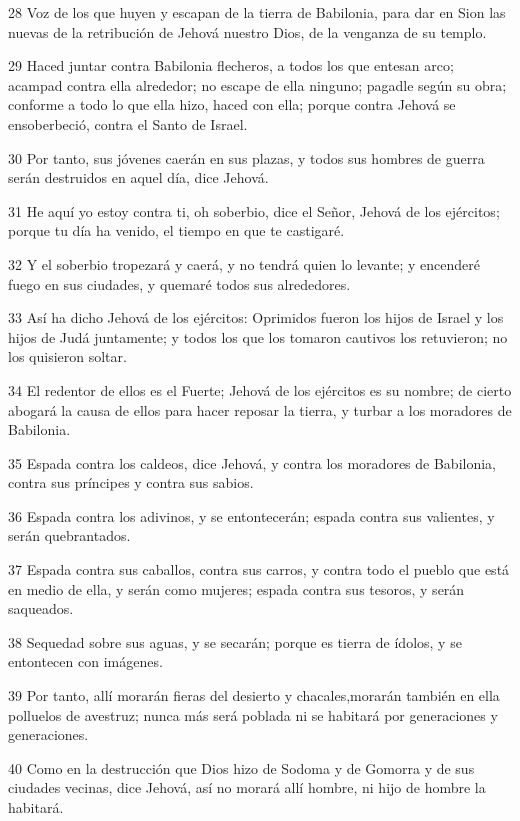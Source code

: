 \par 28 Voz de los que huyen y escapan de la tierra de Babilonia, para dar en Sion las nuevas de la retribución de Jehová nuestro Dios, de la venganza de su templo.
\par 29 Haced juntar contra Babilonia flecheros, a todos los que entesan arco; acampad contra ella alrededor; no escape de ella ninguno; pagadle según su obra; conforme a todo lo que ella hizo, haced con ella; porque contra Jehová se ensoberbeció, contra el Santo de Israel.
\par 30 Por tanto, sus jóvenes caerán en sus plazas, y todos sus hombres de guerra serán destruidos en aquel día, dice Jehová.
\par 31 He aquí yo estoy contra ti, oh soberbio, dice el Señor, Jehová de los ejércitos; porque tu día ha venido, el tiempo en que te castigaré.
\par 32 Y el soberbio tropezará y caerá, y no tendrá quien lo levante; y encenderé fuego en sus ciudades, y quemaré todos sus alrededores.
\par 33 Así ha dicho Jehová de los ejércitos: Oprimidos fueron los hijos de Israel y los hijos de Judá juntamente; y todos los que los tomaron cautivos los retuvieron; no los quisieron soltar.
\par 34 El redentor de ellos es el Fuerte; Jehová de los ejércitos es su nombre; de cierto abogará la causa de ellos para hacer reposar la tierra, y turbar a los moradores de Babilonia.
\par 35 Espada contra los caldeos, dice Jehová, y contra los moradores de Babilonia, contra sus príncipes y contra sus sabios.
\par 36 Espada contra los adivinos, y se entontecerán; espada contra sus valientes, y serán quebrantados.
\par 37 Espada contra sus caballos, contra sus carros, y contra todo el pueblo que está en medio de ella, y serán como mujeres; espada contra sus tesoros, y serán saqueados.
\par 38 Sequedad sobre sus aguas, y se secarán; porque es tierra de ídolos, y se entontecen con imágenes.
\par 39 Por tanto, allí morarán fieras del desierto y chacales,morarán también en ella polluelos de avestruz; nunca más será poblada ni se habitará por generaciones y generaciones.
\par 40 Como en la destrucción que Dios hizo de Sodoma y de Gomorra y de sus ciudades vecinas, dice Jehová, así no morará allí hombre, ni hijo de hombre la habitará.
